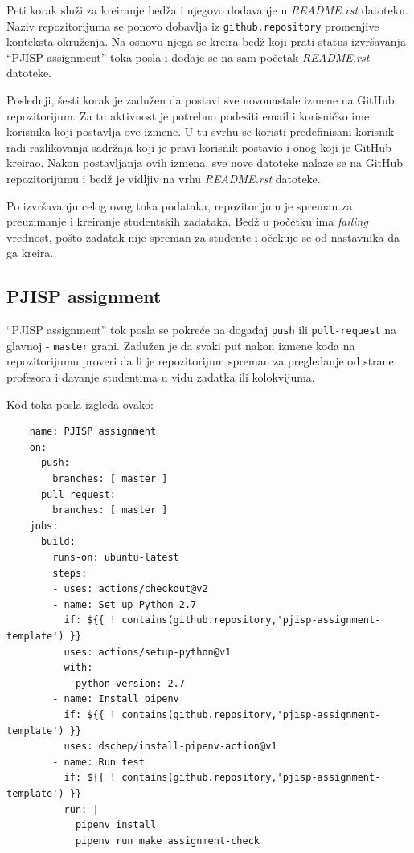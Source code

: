 \documentclass[12pt]{report}
\begin{document}
Peti korak služi za kreiranje bedža i njegovo dodavanje u \textit{README.rst} datoteku. Naziv repozitorijuma se ponovo dobavlja iz \texttt{github.repository} promenjive konteksta okruženja. Na osnovu njega se kreira bedž koji prati status izvršavanja ``PJISP assignment'' toka posla i dodaje se na sam početak \textit{README.rst} datoteke.

Poslednji, šesti korak je zadužen da postavi sve novonastale izmene na GitHub repozitorijum. Za tu aktivnost je potrebno podesiti email i korisničko ime korisnika koji postavlja ove izmene. U tu svrhu se koristi predefinisani korisnik radi razlikovanja sadržaja koji je pravi korisnik postavio i onog koji je GitHub kreirao. Nakon postavljanja ovih izmena, sve nove datoteke nalaze se na GitHub repozitorijumu i bedž je vidljiv na vrhu \textit{README.rst} datoteke.

Po izvršavanju celog ovog toka podataka, repozitorijum je spreman za preuzimanje i kreiranje studentskih zadataka. Bedž u početku ima \textit{failing} vrednost, pošto zadatak nije spreman za studente i očekuje se od nastavnika da ga kreira.

\subsection{PJISP assignment}
``PJISP assignment'' tok posla se pokreće na događaj \texttt{push} ili \texttt{pull-request} na glavnoj - \texttt{master} grani. Zadužen je da svaki put nakon izmene koda na repozitorijumu proveri da li je repozitorijum spreman za pregledanje od strane profesora i davanje studentima u vidu zadatka ili kolokvijuma.

Kod toka posla izgleda ovako:

\begin{verbatim}
    name: PJISP assignment
    on:
      push:
        branches: [ master ]
      pull_request:
        branches: [ master ]
    jobs:
      build:
        runs-on: ubuntu-latest
        steps:
        - uses: actions/checkout@v2
        - name: Set up Python 2.7
          if: ${{ ! contains(github.repository,'pjisp-assignment-template') }}
          uses: actions/setup-python@v1
          with:
            python-version: 2.7
        - name: Install pipenv
          if: ${{ ! contains(github.repository,'pjisp-assignment-template') }}
          uses: dschep/install-pipenv-action@v1
        - name: Run test
          if: ${{ ! contains(github.repository,'pjisp-assignment-template') }}
          run: |
            pipenv install
            pipenv run make assignment-check
\end{verbatim}
\end{document}
